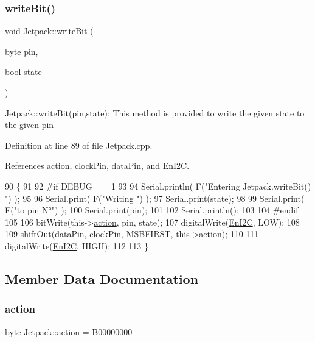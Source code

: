 \subsubsection{\texorpdfstring{write\+Bit()}{writeBit()}}
{\footnotesize\ttfamily void Jetpack\+::write\+Bit (\begin{DoxyParamCaption}\item[{byte}]{pin,  }\item[{bool}]{state }\end{DoxyParamCaption})}

Jetpack\+::write\+Bit(pin,state)\+: This method is provided to write the given state to the given pin 

Definition at line 89 of file Jetpack.\+cpp.



References action, clock\+Pin, data\+Pin, and En\+I2C.


\begin{DoxyCode}
90 \{
91 
92 \textcolor{preprocessor}{#if DEBUG == 1 }
93 
94     Serial.println( F(\textcolor{stringliteral}{"Entering Jetpack.writeBit() "}) );
95 
96     Serial.print( F(\textcolor{stringliteral}{"Writing "}) );
97     Serial.print(state);
98 
99     Serial.print( F(\textcolor{stringliteral}{"to pin N°"}) );
100     Serial.print(pin);
101 
102     Serial.println();
103 
104 \textcolor{preprocessor}{#endif}
105 
106     bitWrite(this->\hyperlink{classJetpack_aca3142925a7b0834b34ae91d26af7765}{action}, pin, state);
107     digitalWrite(\hyperlink{classJetpack_a81df984fb4cea98c71aa1a1cfcdfe814}{EnI2C}, LOW);
108     
109     shiftOut(\hyperlink{classJetpack_a3d669a56e93c71dd25f970d4ed7d0c00}{dataPin}, \hyperlink{classJetpack_a58ebb991f358f3ae94e82148b0221b5a}{clockPin}, MSBFIRST, this->\hyperlink{classJetpack_aca3142925a7b0834b34ae91d26af7765}{action});
110 
111     digitalWrite(\hyperlink{classJetpack_a81df984fb4cea98c71aa1a1cfcdfe814}{EnI2C}, HIGH);
112 
113 \}
\end{DoxyCode}


\subsection{Member Data Documentation}
\mbox{\label{classJetpack_aca3142925a7b0834b34ae91d26af7765}} 
\subsubsection{\texorpdfstring{action}{action}}
{\footnotesize\ttfamily byte Jetpack\+::action = B00000000\hspace{0.3cm}{\ttfamily [private]}}




